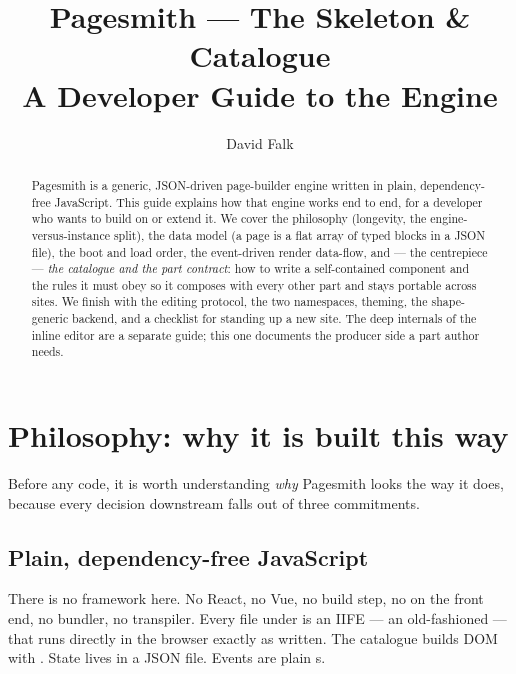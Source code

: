 \documentclass[11pt]{article}
\title{Pagesmith --- The Skeleton \& Catalogue\\[2pt]\large A Developer Guide to the Engine}
\author{David Falk}
\date{}
\begin{document}
\maketitle

\begin{abstract}
\noindent Pagesmith is a generic, JSON-driven page-builder engine written in
plain, dependency-free JavaScript. This guide explains how that engine works end
to end, for a developer who wants to build on or extend it. We cover the
philosophy (longevity, the engine-versus-instance split), the data model (a page
is a flat array of typed blocks in a JSON file), the boot and load order, the
event-driven render data-flow, and --- the centrepiece --- \emph{the catalogue
and the part contract}: how to write a self-contained component and the rules it
must obey so it composes with every other part and stays portable across sites.
We finish with the editing protocol, the two namespaces, theming, the
shape-generic backend, and a checklist for standing up a new site. The deep
internals of the inline editor are a separate guide; this one documents the
producer side a part author needs.
\end{abstract}

\tableofcontents
\bigskip

\section{Philosophy: why it is built this way}

Before any code, it is worth understanding \emph{why} Pagesmith looks the way it
does, because every decision downstream falls out of three commitments.

\subsection{Plain, dependency-free JavaScript}

There is no framework here. No React, no Vue, no build step, no
 on the front end, no bundler, no transpiler. Every file under
 is an IIFE --- an old-fashioned
 --- that runs directly in the browser exactly as
written. The catalogue builds DOM with . State lives
in a JSON file. Events are plain s.
\end{document}

